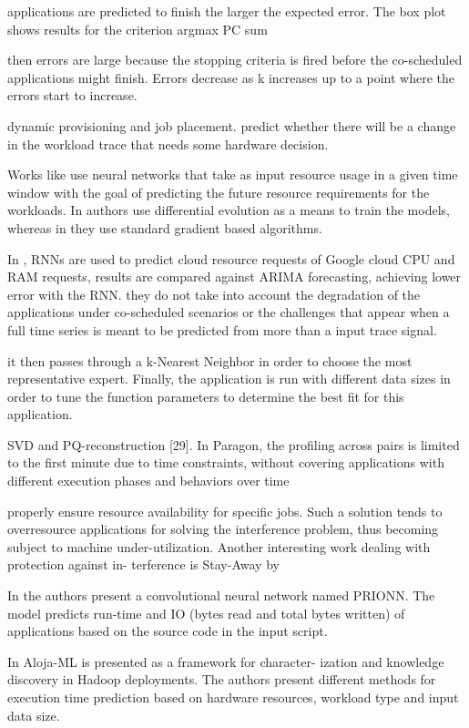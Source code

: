 \documentclass[UTF8]{article}
\begin{document}
applications are predicted to finish the larger the expected error. The box plot shows results for the criterion argmax PC sum

then errors are large because the stopping criteria is fired before the co-scheduled applications might finish. Errors decrease as k increases up to a point where the errors start to increase.

dynamic provisioning and job placement. predict whether there will be a change in the workload trace that needs some hardware decision. 

Works like \cite{islam2012empirical, kumar2018workload} use neural networks that take as input resource usage in a given time window with the goal of predicting the future resource requirements for the workloads. In authors use differential evolution as a means to train the models, whereas in they use standard gradient based algorithms.

In \cite{zhang2016workload}, RNNs are used to predict cloud resource requests of Google cloud CPU and RAM requests, results are compared against ARIMA forecasting, achieving lower error with the RNN. they do not take into account the degradation of the applications under co-scheduled scenarios or the challenges that appear when a full time series is meant to be predicted from more than a input trace signal.

\cite{marco2017improving} it then passes through a k-Nearest Neighbor in order to choose the most representative expert. Finally, the application is run with different data sizes in order to tune the function parameters to determine the best fit for this application. 

SVD and PQ-reconstruction [29]. In Paragon, the profiling across pairs is limited to the first minute due to time constraints, without covering applications with different execution phases and behaviors over time

properly ensure resource availability for specific jobs. Such a solution tends to overresource applications for solving the interference problem, thus becoming subject to machine under-utilization. Another interesting work dealing with protection against in- terference is Stay-Away by \cite{rameshan2014stay}

In \cite{wyatt2018prionn} the authors present a convolutional neural network named PRIONN. The model predicts run-time and IO (bytes read and total bytes written) of applications based on the source code in the input script. 

In \cite{berral2015aloja} Aloja-ML is presented as a framework for character- ization and knowledge discovery in Hadoop deployments. The authors present different methods for execution time prediction based on hardware resources, workload type and input data size.
\end{document}
